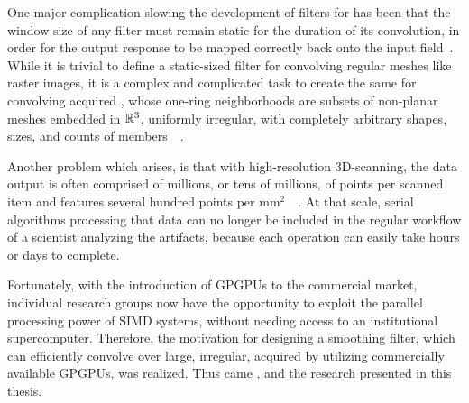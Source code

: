 \documentclass[aspectratio=169,t]{beamer}
\begin{document}
{%
One major complication slowing the development of filters for \tdd{} has been that the window size of any filter must remain static for the duration of its convolution, in order for the output response to be mapped correctly back onto the input field~\cite[p.~106-112]{Jaehne97}. While it is trivial to define a static-sized filter for convolving regular meshes like raster images, it is a complex and complicated task to create the same for convolving acquired \tdd{}, whose one-ring neighborhoods are subsets of non-planar meshes embedded in $\mathbb{R}^{3}$, uniformly irregular, with completely arbitrary shapes, sizes, and counts of members~\cite[p.~29]{Mara12}~\cite[s.~3.2]{Mara17}.

Another problem which arises, is that with high-resolution 3D-scanning, the data output is often comprised of millions, or tens of millions, of points per scanned item and features several hundred points per mm$^2$~\cite[25,144]{Mara17}~\cite[4]{ILATO14}. At that scale, serial algorithms processing that data can no longer be included in the regular workflow of a scientist analyzing the artifacts, because each operation can easily take hours or days to complete.


Fortunately, with the introduction of GPGPUs to the commercial market, individual research groups now have the opportunity to exploit the parallel processing power of SIMD systems, without needing access to an institutional supercomputer. Therefore, the motivation for designing a smoothing filter, which can efficiently convolve over large, irregular, acquired \tdd{} by utilizing commercially available GPGPUs, was realized. Thus came , and the research presented in this thesis.
}




\end{document}
